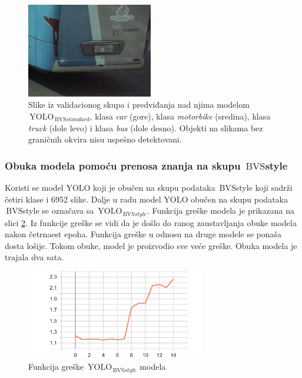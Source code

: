 \documentclass[12pt,oneside]{memoir}
\newcommand{\yolo}{\ensuremath{\,\textrm{YOLO}}}
\newcommand{\bvs}{\ensuremath{\,\textrm{BVS}}}
\begin{document}
\begin{figure}[!htbp]
  \includegraphics[width=0.49\textwidth]{matfmaster/yolo/v4/basic_augmentation/bus_0.jpg}
\caption{Slike iz validacionog skupa i predviđanja nad njima modelom  $\yolo_{\bvs{standard}}$, klasa \textit{car} (gore), klasa \textit{motorbike} (sredina), klasa \textit{truck} (dole levo) i klasa \textit{bus} (dole desno). Objekti na slikama bez graničnih okvira nisu uspešno detektovani.}\label{fig:YOLOv4_basaug}
\end{figure}


\subsubsection{Obuka modela pomoću prenosa znanja na skupu \bvs{style}}

Koristi se model YOLO koji je obučen na skupu podataka \bvs{style} koji sadrži četiri klase i 6952 slike. Dalje u radu model YOLO obučen na skupu podataka \bvs{style} se označava sa $\yolo_{\bvs{style}}$. Funkcija greške modela je prikazana na slici \ref{fig:section4_yolo4styleaug_loss}. Iz funkcije greške se vidi da je došlo do ranog zaustavljanja obuke modela nakon četrnaest epoha. Funkcija greške u odnosu na druge modele se ponaša dosta lošije. Tokom obuke, model je proizvodio sve veće greške. Obuka modela je trajala dva sata.


\begin{figure}[!htbp]
\centering
  \includegraphics[width=0.70\textwidth]{matfmaster/yolo/v4/stylegan_augmentation/epoch_loss.png}
\caption{Funkcija greške $\yolo_{\bvs{style}}$ modela}\label{fig:section4_yolo4styleaug_loss}
\end{figure}
\end{document}
